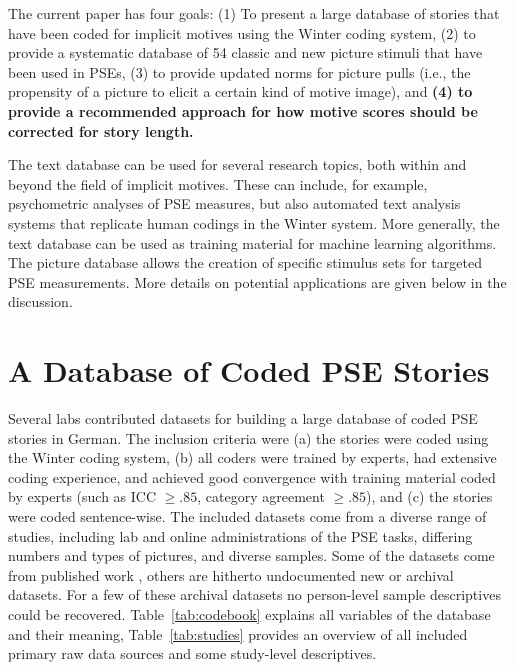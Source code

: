 \documentclass[man,a4paper,mask]{apa6}\usepackage[]{graphicx}\usepackage[]{color}
\newcommand{\added}[1]{\textcolor{colour_added}{\bf{#1}}}
\begin{document}
The current paper has four goals: (1) To present a large database of stories that have been coded for implicit motives using the Winter coding system, (2) to provide a systematic database of 54 classic and new picture stimuli that have been used in PSEs, (3) to provide updated norms for picture pulls (i.e., the propensity of a picture to elicit a certain kind of motive image), and \added{(4) to provide a recommended approach for how motive scores should be corrected for story length.}

The text database can be used for several research topics, both within and beyond the field of implicit motives. These can include, for example, psychometric analyses of PSE measures, but also automated text analysis systems that replicate human codings in the Winter system. More generally, the text database can be used as training material for machine learning algorithms. The picture database allows the creation of specific stimulus sets for targeted PSE measurements. More details on potential applications are given below in the discussion.


\section{A Database of Coded PSE Stories}

Several labs contributed datasets for building a large database of coded PSE stories in German. The inclusion criteria were (a) the stories were coded using the Winter coding system, (b) all coders were trained by experts, had extensive coding experience, and achieved good convergence with training material coded by experts (such as ICC $\geq .85$, category agreement $\geq .85$), and (c) the stories were coded sentence-wise.
The included datasets come from a diverse range of studies, including lab and online administrations of the PSE tasks, differing numbers and types of pictures, and diverse samples. Some of the datasets come from published work \parencite{kollner_SocialBiopsychologyImplicit_2019,kollner_InfluenceImplicitMotives_2015,janson_InhibitedPowerMotivation_2018a,janson_ImplicitPowerMotive_2017,zygar_EinflussEmotionalerIntelligenz_2013,czikmantori_ExperienceIntrinsicMotivation_2018}, others are hitherto undocumented new or archival datasets. For a few of these archival datasets no person-level sample descriptives could be recovered. Table~\ref{tab:codebook} explains all variables of the database and their meaning, Table~\ref{tab:studies} provides an overview of all included primary raw data sources and some study-level descriptives.
\end{document}
